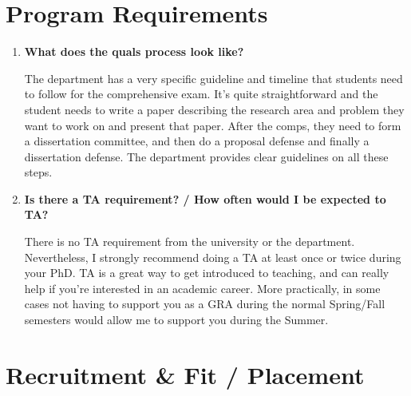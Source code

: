 \documentclass{article}
\begin{document}
\section{Program Requirements}

\begin{enumerate}[label=\arabic*.]
    \item \textbf{What does the quals process look like?}  
    
    The department has a very specific guideline and timeline that students need to follow for the comprehensive exam. It's quite straightforward and the student needs to write a paper describing the research area and problem they want to work on and present that paper. After the comps, they need to form a dissertation committee, and then do a proposal defense and finally a dissertation defense. The department provides clear guidelines on all these steps.

    \item \textbf{Is there a TA requirement? / How often would I be expected to TA?}

    There is no TA requirement from the university or the department. Nevertheless, I strongly recommend doing a TA at least once or twice during your PhD. TA is a great way to get introduced to teaching, and can really help if you're interested in an academic career. More practically, in some cases not having to support you as a GRA during the normal Spring/Fall semesters would allow me to support you during the Summer.
\end{enumerate}

\section{Recruitment \& Fit / Placement}\label{sec:recruitment}
\end{document}
